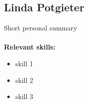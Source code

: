 \documentclass[12pt,a4paper]{article}
\begin{document}
        
        \subsection{Linda Potgieter}
        Short personal summary\\\\
        \textbf{\small Relevant skills:}
        \begin{itemize}
            \item skill 1
            \item skill 2
            \item skill 3
        \end{itemize}
\end{document}
